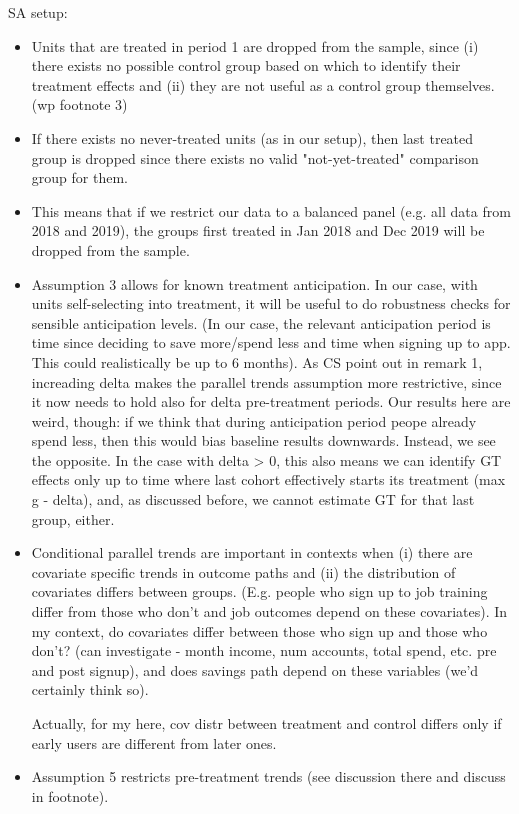 SA setup:
\begin{itemize}
    \item Units that are treated in period 1 are dropped from the sample, since
        (i) there exists no possible control group based on which to identify
        their treatment effects and (ii) they are not useful as a control group
        themselves. (wp footnote 3)

    \item If there exists no never-treated units (as in our setup), then last
        treated group is dropped since there exists no valid "not-yet-treated"
        comparison group for them.

    \item This means that if we restrict our data to a balanced panel (e.g. all
        data from 2018 and 2019), the groups first treated in Jan 2018 and Dec
        2019 will be dropped from the sample.

    \item Assumption 3 allows for known treatment anticipation. In our case,
        with units self-selecting into treatment, it will be useful to do
        robustness checks for sensible anticipation levels. (In our case, the
        relevant anticipation period is time since deciding to save more/spend
        less and time when signing up to app. This could realistically be up to
        6 months). As CS point out in remark 1, increading delta makes
        the parallel trends assumption more restrictive, since it now needs to
        hold also for delta pre-treatment periods.
        Our results here are weird, though: if we think that during
        anticipation period peope already spend less, then this would bias
        baseline results downwards. Instead, we see the opposite. In the case
        with delta > 0, this also means we can identify GT effects only up to
        time where last cohort effectively starts its treatment (max g -
        delta), and, as discussed before, we cannot estimate GT for that last
        group, either.

    \item Conditional parallel trends are important in contexts when (i) there
        are covariate specific trends in outcome paths and (ii) the
        distribution of covariates differs between groups. (E.g. people who
        sign up to job training differ from those who don't and job outcomes
        depend on these covariates). In my context, do covariates differ
        between those who sign up and those who don't? (can investigate - month
        income, num accounts, total spend, etc. pre and post signup), and does
        savings path depend on these variables (we'd certainly think so).

        Actually, for my here, cov distr between treatment and control differs
        only if early users are different from later ones.

    \item Assumption 5 restricts pre-treatment trends (see discussion there and
        discuss in footnote).

\end{itemize}


